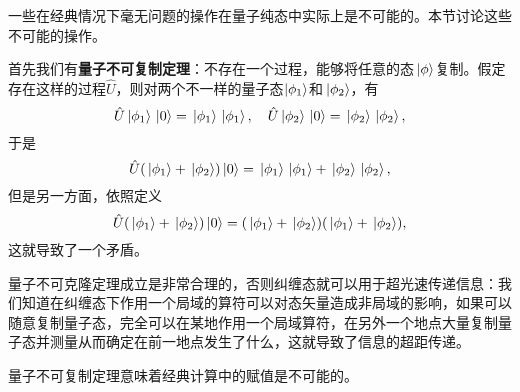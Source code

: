 \documentclass[UTF8, a4paper]{ctexart}
\begin{document}
一些在经典情况下毫无问题的操作在量子纯态中实际上是不可能的。本节讨论这些不可能的操作。

首先我们有\textbf{量子不可复制定理}：不存在一个过程，能够将任意的态$\ket*{\phi}$复制。假定存在这样的过程$\hat{U}$，则对两个不一样的量子态$\ket{\phi_1}$和$\ket*{\phi_2}$，有
\[
    \hat{U} \ket*{\phi_1} \ket*{0} = \ket*{\phi_1} \ket*{\phi_1}, \quad \hat{U} \ket*{\phi_2} \ket*{0} = \ket*{\phi_2} \ket*{\phi_2} ,
\]
于是
\[
    \hat{U} (\ket*{\phi_1} + \ket*{\phi_2}) \ket*{0} = \ket*{\phi_1} \ket*{\phi_1} + \ket*{\phi_2} \ket*{\phi_2},
\]
但是另一方面，依照定义
\[
    \hat{U} (\ket*{\phi_1} + \ket*{\phi_2}) \ket*{0} = (\ket*{\phi_1} + \ket*{\phi_2}) (\ket*{\phi_1} + \ket*{\phi_2}),
\]
这就导致了一个矛盾。

量子不可克隆定理成立是非常合理的，否则纠缠态就可以用于超光速传递信息：我们知道在纠缠态下作用一个局域的算符可以对态矢量造成非局域的影响，如果可以随意复制量子态，完全可以在某地作用一个局域算符，在另外一个地点大量复制量子态并测量从而确定在前一地点发生了什么，这就导致了信息的超距传递。

量子不可复制定理意味着经典计算中的赋值是不可能的。
\end{document}
